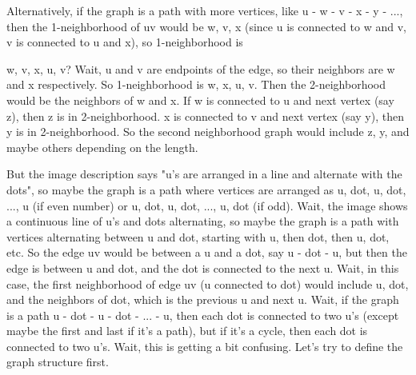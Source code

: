 Alternatively, if the graph is a path with more vertices, like u - w - v - x - y - ..., then the 1-neighborhood of uv would be w, v, x (since u is connected to w and v, v is connected to u and x), so 1-neighborhood is {w, v, x, u, v? Wait, u and v are endpoints of the edge, so their neighbors are w and x respectively. So 1-neighborhood is w, x, u, v. Then the 2-neighborhood would be the neighbors of w and x. If w is connected to u and next vertex (say z), then z is in 2-neighborhood. x is connected to v and next vertex (say y), then y is in 2-neighborhood. So the second neighborhood graph would include z, y, and maybe others depending on the length.

But the image description says "u's are arranged in a line and alternate with the dots", so maybe the graph is a path where vertices are arranged as u, dot, u, dot, ..., u (if even number) or u, dot, u, dot, ..., u, dot (if odd). Wait, the image shows a continuous line of u's and dots alternating, so maybe the graph is a path with vertices alternating between u and dot, starting with u, then dot, then u, dot, etc. So the edge uv would be between a u and a dot, say u - dot - u, but then the edge is between u and dot, and the dot is connected to the next u. Wait, in this case, the first neighborhood of edge uv (u connected to dot) would include u, dot, and the neighbors of dot, which is the previous u and next u. Wait, if the graph is a path u - dot - u - dot - ... - u, then each dot is connected to two u's (except maybe the first and last if it's a path), but if it's a cycle, then each dot is connected to two u's. Wait, this is getting a bit confusing. Let's try to define the graph structure first.

}
